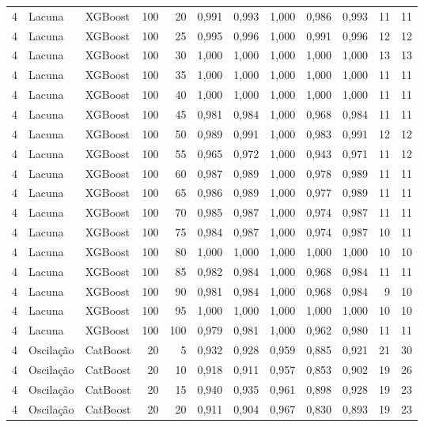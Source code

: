 \begin{longtable}{@{}rllrrrrrrrrr@{}}
4 & Lacuna & XGBoost & 100 & 20 & 0,991 & 0,993 & 1,000 & 0,986 & 0,993 & 11 & 11 \\
4 & Lacuna & XGBoost & 100 & 25 & 0,995 & 0,996 & 1,000 & 0,991 & 0,996 & 12 & 12 \\
4 & Lacuna & XGBoost & 100 & 30 & 1,000 & 1,000 & 1,000 & 1,000 & 1,000 & 13 & 13 \\
4 & Lacuna & XGBoost & 100 & 35 & 1,000 & 1,000 & 1,000 & 1,000 & 1,000 & 11 & 11 \\
4 & Lacuna & XGBoost & 100 & 40 & 1,000 & 1,000 & 1,000 & 1,000 & 1,000 & 11 & 11 \\
4 & Lacuna & XGBoost & 100 & 45 & 0,981 & 0,984 & 1,000 & 0,968 & 0,984 & 11 & 11 \\
4 & Lacuna & XGBoost & 100 & 50 & 0,989 & 0,991 & 1,000 & 0,983 & 0,991 & 12 & 12 \\
4 & Lacuna & XGBoost & 100 & 55 & 0,965 & 0,972 & 1,000 & 0,943 & 0,971 & 11 & 12 \\
4 & Lacuna & XGBoost & 100 & 60 & 0,987 & 0,989 & 1,000 & 0,978 & 0,989 & 11 & 11 \\
4 & Lacuna & XGBoost & 100 & 65 & 0,986 & 0,989 & 1,000 & 0,977 & 0,989 & 11 & 11 \\
4 & Lacuna & XGBoost & 100 & 70 & 0,985 & 0,987 & 1,000 & 0,974 & 0,987 & 11 & 11 \\
4 & Lacuna & XGBoost & 100 & 75 & 0,984 & 0,987 & 1,000 & 0,974 & 0,987 & 10 & 11 \\
4 & Lacuna & XGBoost & 100 & 80 & 1,000 & 1,000 & 1,000 & 1,000 & 1,000 & 10 & 10 \\
4 & Lacuna & XGBoost & 100 & 85 & 0,982 & 0,984 & 1,000 & 0,968 & 0,984 & 11 & 11 \\
4 & Lacuna & XGBoost & 100 & 90 & 0,981 & 0,984 & 1,000 & 0,968 & 0,984 & 9 & 10 \\
4 & Lacuna & XGBoost & 100 & 95 & 1,000 & 1,000 & 1,000 & 1,000 & 1,000 & 10 & 10 \\
4 & Lacuna & XGBoost & 100 & 100 & 0,979 & 0,981 & 1,000 & 0,962 & 0,980 & 11 & 11 \\
4 & Oscilação & CatBoost & 20 & 5 & 0,932 & 0,928 & 0,959 & 0,885 & 0,921 & 21 & 30 \\
4 & Oscilação & CatBoost & 20 & 10 & 0,918 & 0,911 & 0,957 & 0,853 & 0,902 & 19 & 26 \\
4 & Oscilação & CatBoost & 20 & 15 & 0,940 & 0,935 & 0,961 & 0,898 & 0,928 & 19 & 23 \\
4 & Oscilação & CatBoost & 20 & 20 & 0,911 & 0,904 & 0,967 & 0,830 & 0,893 & 19 & 23 \\

\end{longtable}

